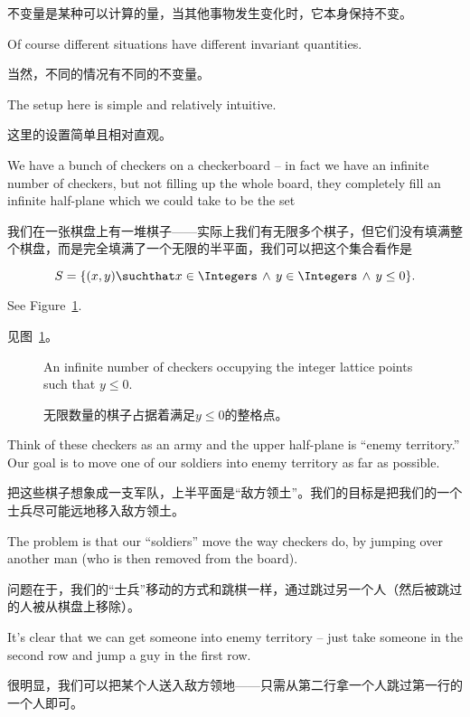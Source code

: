不变量是某种可以计算的量，当其他事物发生变化时，它本身保持不变。

Of course different situations have different
invariant quantities.  

当然，不同的情况有不同的不变量。

The setup here is simple and relatively intuitive.

这里的设置简单且相对直观。

We have a bunch
of checkers on a checkerboard -- in fact we have an infinite number
of checkers, but not filling up the whole board, they completely fill
an infinite half-plane which we could take to be the set

我们在一张棋盘上有一堆棋子——实际上我们有无限多个棋子，但它们没有填满整个棋盘，而是完全填满了一个无限的半平面，我们可以把这个集合看作是

\[ S = \{(x,y) \suchthat x \in \Integers \, \land \, y \in \Integers \, \land \, y \leq 0 \}. \]

See Figure~\ref{fig:the_army}.
 
见图~\ref{fig:the_army}。

\begin{figure}[!hbtp] 
\begin{center}

\end{center}
\caption[An infinite army in the lower half-plane.]{An infinite number of
checkers occupying the integer lattice points such that $y\leq 0$.}
\caption[下半平面中的无限军队。]{无限数量的棋子占据着满足$y\leq 0$的整格点。}
\label{fig:the_army}
\end{figure}
  
Think of these checkers as an army and the upper half-plane is ``enemy 
territory.''  Our goal is to move one of our soldiers into enemy territory
as far as possible.

把这些棋子想象成一支军队，上半平面是“敌方领土”。我们的目标是把我们的一个士兵尽可能远地移入敌方领土。

The problem is that our ``soldiers'' move the 
way checkers do, by jumping over another man (who is then removed from 
the board).

问题在于，我们的“士兵”移动的方式和跳棋一样，通过跳过另一个人（然后被跳过的人被从棋盘上移除）。

It's clear that we can get someone into enemy territory --
just take someone in the second row and jump a guy in the first row.

很明显，我们可以把某个人送入敌方领地——只需从第二行拿一个人跳过第一行的一个人即可。

